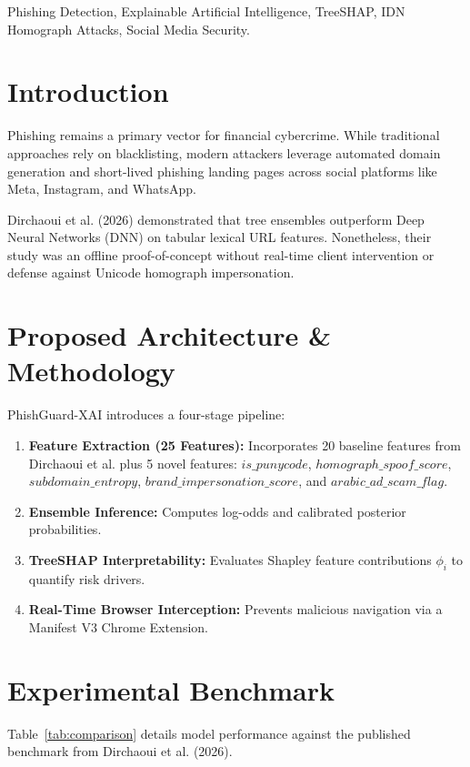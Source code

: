 \documentclass[conference]{IEEEtran}
\begin{document}
\begin{IEEEkeywords}
Phishing Detection, Explainable Artificial Intelligence, TreeSHAP, IDN Homograph Attacks, Social Media Security.
\end{IEEEkeywords}

\section{Introduction}
Phishing remains a primary vector for financial cybercrime. While traditional approaches rely on blacklisting, modern attackers leverage automated domain generation and short-lived phishing landing pages across social platforms like Meta, Instagram, and WhatsApp.

Dirchaoui et al. (2026) demonstrated that tree ensembles outperform Deep Neural Networks (DNN) on tabular lexical URL features. Nonetheless, their study was an offline proof-of-concept without real-time client intervention or defense against Unicode homograph impersonation.

\section{Proposed Architecture \& Methodology}
PhishGuard-XAI introduces a four-stage pipeline:
\begin{enumerate}
    \item \textbf{Feature Extraction (25 Features):} Incorporates 20 baseline features from Dirchaoui et al. plus 5 novel features: $is\_punycode$, $homograph\_spoof\_score$, $subdomain\_entropy$, $brand\_impersonation\_score$, and $arabic\_ad\_scam\_flag$.
    \item \textbf{Ensemble Inference:} Computes log-odds and calibrated posterior probabilities.
    \item \textbf{TreeSHAP Interpretability:} Evaluates Shapley feature contributions $\phi_i$ to quantify risk drivers.
    \item \textbf{Real-Time Browser Interception:} Prevents malicious navigation via a Manifest V3 Chrome Extension.
\end{enumerate}

\section{Experimental Benchmark}
Table~\ref{tab:comparison} details model performance against the published benchmark from Dirchaoui et al. (2026).
\end{document}
